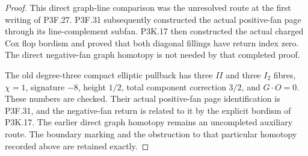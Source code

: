 \begin{proof}
This direct graph-line comparison was the unresolved route at the first writing of P3F.27. P3F.31 subsequently constructed the actual positive-fan page through its line-complement subfan. P3K.17 then constructed the actual charged Cox flop bordism and proved that both diagonal fillings have return index zero. The direct negative-fan graph homotopy is not needed by that completed proof.

The old degree-three compact elliptic pullback has three \(II\) and three \(I_2\) fibres, \(\chi=1\), signature \(-8\), height \(1/2\), total component correction \(3/2\), and \(G\cdot O=0\). These numbers are checked. Their actual positive-fan page identification is P3F.31, and the negative-fan return is related to it by the explicit bordism of P3K.17. The earlier direct graph homotopy remains an uncompleted auxiliary route. The boundary marking and the obstruction to that particular homotopy recorded above are retained exactly.
\end{proof}
